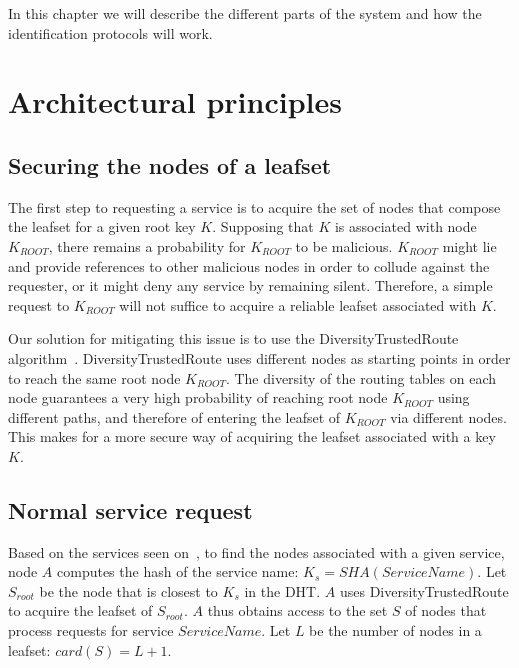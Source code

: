 
In this chapter we will describe the different parts of the system and how the
identification protocols will work.

\section{Architectural principles}

\subsection{Securing the nodes of a leafset}

The first step to requesting a service is to acquire the set of nodes that
compose the leafset for a given root key $K$. Supposing that $K$ is associated
with node $K_{ROOT}$, there remains a probability for $K_{ROOT}$ to be
malicious. $K_{ROOT}$ might lie and provide references to other malicious nodes
in order to collude against the requester, or it might deny any service by
remaining silent. Therefore, a simple request to $K_{ROOT}$ will not suffice to
acquire a reliable leafset associated with $K$.

Our solution for mitigating this issue is to use the DiversityTrustedRoute
algorithm~\cite{diversity_trusted_route}. DiversityTrustedRoute uses different
nodes as starting points in order to reach the same root node $K_{ROOT}$. The
diversity of the routing tables on each node guarantees a very high probability
of reaching root node $K_{ROOT}$ using different paths, and therefore of
entering the leafset of $K_{ROOT}$ via different nodes. This makes for a more
secure way of acquiring the leafset associated with a key $K$.

\subsection{Normal service request}

Based on the services seen on~\cite{p2p_certification}, to find the nodes associated with a given
service, node $A$ computes the hash
of the service name: $K_s = SHA(ServiceName)$. Let $S_{root} $ be the node that
is closest to $K_s$ in the DHT. $A$ uses DiversityTrustedRoute to acquire the
leafset of $S_{root}$. $A$ thus obtains access to the set $S$ of nodes that
process requests for service $ServiceName$. Let $L$ be the number of nodes in a
leafset: $card(S) = L + 1$.

